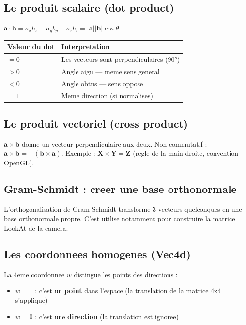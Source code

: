 \documentclass[12pt,a4paper]{report}
\begin{document}
\subsection*{Le produit scalaire (dot product)}

$\mathbf{a} \cdot \mathbf{b} = a_x b_x + a_y b_y + a_z b_z = |\mathbf{a}||\mathbf{b}|\cos\theta$

\begin{center}
\begin{tabular}{ll}
  \toprule
  Valeur du dot & Interpretation \\
  \midrule
  $= 0$  & Les vecteurs sont perpendiculaires ($90°$) \\
  $> 0$  & Angle aigu --- meme sens general \\
  $< 0$  & Angle obtus --- sens oppose \\
  $= 1$  & Meme direction (si normalises) \\
  \bottomrule
\end{tabular}
\end{center}

\subsection*{Le produit vectoriel (cross product)}

$\mathbf{a} \times \mathbf{b}$ donne un vecteur perpendiculaire aux deux. Non-commutatif : $\mathbf{a} \times \mathbf{b} = -(\mathbf{b} \times \mathbf{a})$. Exemple : $\mathbf{X} \times \mathbf{Y} = \mathbf{Z}$ (regle de la main droite, convention OpenGL).

\subsection*{Gram-Schmidt : creer une base orthonormale}

L'orthogonalisation de Gram-Schmidt transforme 3 vecteurs quelconques en une base orthonormale propre. C'est utilise notamment pour construire la matrice LookAt de la camera.

\subsection*{Les coordonnees homogenes (Vec4d)}

La 4eme coordonnee $w$ distingue les points des directions :
\begin{itemize}
  \item $w = 1$ : c'est un \textbf{point} dans l'espace (la translation de la matrice 4x4 s'applique)
  \item $w = 0$ : c'est une \textbf{direction} (la translation est ignoree)
\end{itemize}
\end{document}
